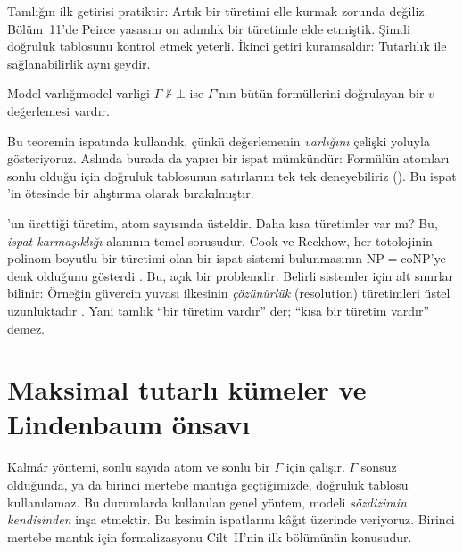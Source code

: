 Tamlığın ilk getirisi pratiktir: Artık bir türetimi elle kurmak zorunda
değiliz. Bölüm~11'de Peirce yasasını on adımlık bir türetimle elde
etmiştik. Şimdi doğruluk tablosunu kontrol etmek yeterli. İkinci getiri
kuramsaldır: Tutarlılık ile sağlanabilirlik aynı şeydir.


\begin{teorem}{Model varlığı}{model-varligi}
$\Gamma \nvdash \bot$ ise $\Gamma$'nın bütün formüllerini doğrulayan bir
$v$ değerlemesi vardır.
\end{teorem}

\noindent Bu teoremin ispatında 
kullandık, çünkü değerlemenin \emph{varlığını} çelişki yoluyla
gösteriyoruz. Aslında burada da yapıcı bir ispat mümkündür:
Formülün atomları sonlu olduğu için doğruluk tablosunun satırlarını tek
tek deneyebiliriz (). Bu ispat 'in
ötesinde bir alıştırma olarak bırakılmıştır.

\begin{dikkat}
'un ürettiği türetim, atom sayısında üsteldir. Daha
kısa türetimler var mı? Bu, \emph{ispat karmaşıklığı} alanının temel
sorusudur. Cook ve Reckhow, her totolojinin polinom boyutlu bir türetimi
olan bir ispat sistemi bulunmasının $\mathrm{NP} = \mathrm{coNP}$'ye denk
olduğunu gösterdi \citep{cookreckhow1979}. Bu, açık bir problemdir. Belirli
sistemler için alt sınırlar bilinir: Örneğin güvercin yuvası ilkesinin
\emph{çözünürlük} (resolution) türetimleri üstel uzunluktadır
\citep{haken1985}. Yani tamlık ``bir türetim vardır'' der; ``kısa bir
türetim vardır'' demez.
\end{dikkat}

\section{Maksimal tutarlı kümeler ve Lindenbaum önsavı}\label{sec:lindenbaum}

Kalmár yöntemi, sonlu sayıda atom ve sonlu bir $\Gamma$ için çalışır.
$\Gamma$ sonsuz olduğunda, ya da birinci mertebe mantığa geçtiğimizde,
doğruluk tablosu kullanılamaz. Bu durumlarda kullanılan genel yöntem,
modeli \emph{sözdizimin kendisinden} inşa etmektir. Bu kesimin
ispatlarını kâğıt üzerinde veriyoruz. Birinci mertebe mantık için
\Lean{} formalizasyonu Cilt~II'nin ilk bölümünün konusudur.

